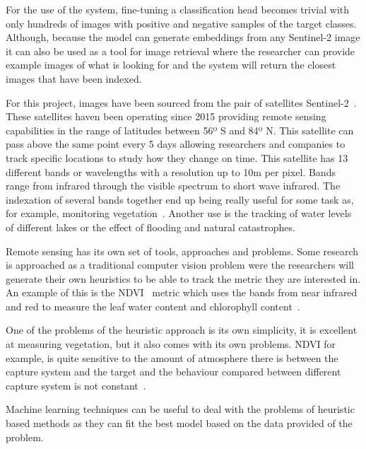 \documentclass[conference]{IEEEtran}
\begin{document}
    For the use of the system, fine-tuning a classification head becomes trivial with only hundreds of images with positive and negative
    samples of the target classes.
    Although, because the model can generate embeddings from any Sentinel-2 image it can also be used as a tool for image retrieval
    where the researcher can provide example images of what is looking for and the system will return the closest images that
    have been indexed.

    For this project, images have been sourced from the pair of satellites Sentinel-2~\cite{sentinel-2}.
    These satellites haven been operating since 2015 providing remote sensing capabilities in the range of latitudes between 56º S and 84º N\@.
    This satellite can pass above the same point every 5 days allowing researchers and companies to track specific locations
    to study how they change on time.
    This satellite has 13 different bands or wavelengths with a resolution up to 10m per pixel.
    Bands range from infrared through the visible spectrum to short wave infrared.
    The indexation of several bands together end up being really useful for some task as, for example, monitoring vegetation~\cite{TUCKER1979127}.
    Another use is the tracking of water levels of different lakes or the effect of flooding and natural catastrophes.

    Remote sensing has its own set of tools, approaches and problems.
    Some research is approached as a traditional computer vision problem were the researchers will
    generate their own heuristics to be able to track the metric they are interested in.
    An example of this is the NDVI~\cite{NDVIsource} metric which uses the bands from near infrared and red to
    measure the leaf water content and chlorophyll content~\cite{TUCKER1979127}.

    One of the problems of the heuristic approach is its own simplicity, it is excellent at measuring
    vegetation, but it also comes with its own problems.
    NDVI for example, is quite sensitive to the amount of atmosphere there is between the capture system and the target and
    the behaviour compared between different capture system is not constant~\cite{Huang2021}.

    Machine learning techniques can be useful to deal with the problems of heuristic based methods as they can fit the best model
    based on the data provided of the problem.
\end{document}
